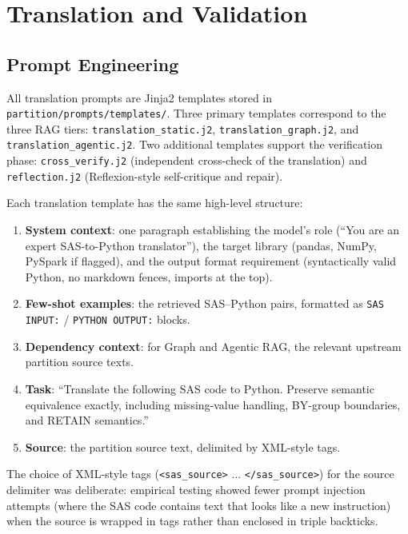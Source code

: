 \section{Translation and Validation}
\label{sec:translation-impl}

\subsection{Prompt Engineering}
\label{subsec:prompt-engineering}

All translation prompts are Jinja2 templates stored in
\texttt{partition/prompts/templates/}. Three primary templates correspond to
the three RAG tiers: \texttt{translation\_static.j2},
\texttt{translation\_graph.j2}, and \texttt{translation\_agentic.j2}. Two
additional templates support the verification phase: \texttt{cross\_verify.j2}
(independent cross-check of the translation) and \texttt{reflection.j2}
(Reflexion-style self-critique and repair).

Each translation template has the same high-level structure:
\begin{enumerate}
  \item \textbf{System context}: one paragraph establishing the model's role
    (``You are an expert SAS-to-Python translator''), the target library
    (pandas, NumPy, PySpark if flagged), and the output format requirement
    (syntactically valid Python, no markdown fences, imports at the top).
  \item \textbf{Few-shot examples}: the retrieved SAS--Python pairs, formatted
    as \texttt{SAS INPUT:} / \texttt{PYTHON OUTPUT:} blocks.
  \item \textbf{Dependency context}: for Graph and Agentic RAG, the relevant
    upstream partition source texts.
  \item \textbf{Task}: ``Translate the following SAS code to Python. Preserve
    semantic equivalence exactly, including missing-value handling, BY-group
    boundaries, and RETAIN semantics.''
  \item \textbf{Source}: the partition source text, delimited by XML-style tags.
\end{enumerate}

The choice of XML-style tags (\texttt{<sas\_source>} ... \texttt{</sas\_source>})
for the source delimiter was deliberate: empirical testing showed fewer prompt
injection attempts (where the SAS code contains text that looks like a new
instruction) when the source is wrapped in tags rather than enclosed in triple
backticks.

